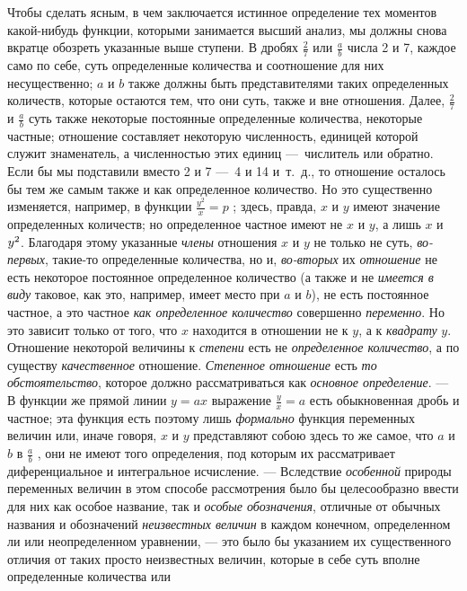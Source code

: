 {Чтобы сделать ясным, в чем заключается истинное определение тех моментов
какой-нибудь функции, которыми занимается высший анализ, мы должны снова
вкратце обозреть указанные выше ступени. В дробях  $\frac 2 7$  или  $\frac
a b$  числа 2 и 7, каждое само по себе, суть определенные количества и
соотношение для них несущественно; $a$ и
$b$ также должны быть представителями таких
определенных количеств, которые остаются тем, что они суть, также и вне
отношения. Далее,  $\frac 2 7$  и  $\frac a b$  суть также некоторые
постоянные определенные количества, некоторые частные; отношение составляет
некоторую численность, единицей которой служит знаменатель, а численностью
этих единиц —~числитель или обратно. Если бы мы подставили вместо 2 и 7 —~4
и 14 и~т.~д., то отношение осталось бы тем же самым также и как
определенное количество. Но это существенно изменяется, например, в функции
 $\frac{y^2} x=p$ ; здесь, правда, $x$ и
$y$ имеют значение определенных количеств; но
определенное частное имеют не $x$ и
$y$, а лишь $x$ и
$y\textsuperscript{2}$. Благодаря этому указанные
{\em члены} отношения $x$ и
$y$ не только не суть,
{\em во-первых}, такие-то определенные количества, но
и, {\em во-вторых} их
{\em отношение} не есть некоторое постоянное
определенное количество (а также и не {\em имеется в
виду} таковое, как это, например, имеет место при
$a$ и $b$), не есть
постоянное частное, а это частное {\em как определенное
количество} совершенно {\em переменно}. Но это зависит
только от того, что $x$ находится в отношении не к
$y$, а к {\em квадрату}
$y$. Отношение некоторой величины к
{\em степени} есть не
{\em определенное количество}, а по существу
{\em качественное} отношение.
{\em Степенное отношение} есть
{\em то обстоятельство}, которое должно рассматриваться
как {\em основное определение}. — В функции же прямой
линии  $y=\mathit{ax}$  выражение  $\frac y x=a$  есть обыкновенная дробь и
частное; эта функция есть поэтому лишь {\em формально}
функция переменных величин или, иначе говоря, $x$ и
$y$ представляют собою здесь то же самое, что
$a$ и $b$ в
$\frac a b$ , они не имеют того определения, под которым их рассматривает
диференциальное и интегральное исчисление. — Вследствие
{\em особенной} природы переменных величин в этом
способе рассмотрения было бы целесообразно ввести для них как особое
название, так и {\em особые обозначения}, отличные от
обычных названия и обозначений {\em неизвестных
величин} в каждом конечном, определенном ли или неопределенном уравнении, —
это было бы указанием их существенного отличия от таких просто неизвестных
величин, которые в себе суть вполне определенные количества или
}
